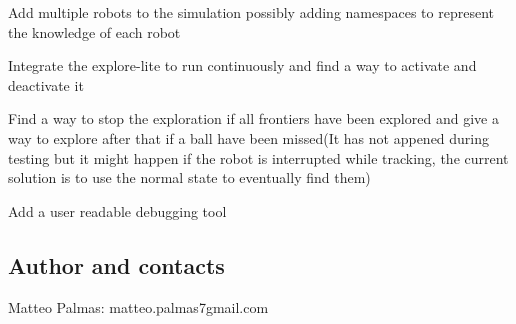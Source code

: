 \begin{DoxyItemize}
\item Add multiple robots to the simulation possibly adding namespaces to represent the knowledge of each robot
\item Integrate the explore-\/lite to run continuously and find a way to activate and deactivate it
\item Find a way to stop the exploration if all frontiers have been explored and give a way to explore after that if a ball have been missed(\+It has not appened during testing but it might happen if the robot is interrupted while tracking, the current solution is to use the normal state to eventually find them)
\item Add a user readable debugging tool
\end{DoxyItemize}

\subsection*{Author and contacts}

Matteo Palmas\+: matteo.\+palmas7gmail.\+com 